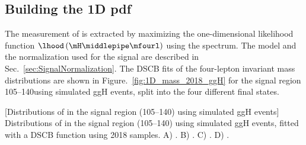 \subsection{Building the 1D pdf}
The measurement of \mH is extracted by maximizing the one-dimensional likelihood function $\lhood \left( \mH \middlepipe \mfourl \right)$ using the \mfourl spectrum.  %
The model and the normalization used for the signal are described in Sec.~\ref{sec:SignalNormalization}.
The DSCB fits of the four-lepton invariant mass distributions are shown in Figure.~\ref{fig:1D_mass_2018_ggH} for the signal region 105--140\GeV using simulated ggH events, split into the four different final states.
\begin{multiFigure}
    \centering
        [Distributions of \mfourl in the signal region (105--140\GeV) using simulated ggH events]
        {Distributions of \mfourl in the signal region (105--140\GeV) using simulated ggH events, fitted with a DSCB function using 2018 samples.
        \;A) \fourmu.
        \;B) \foure.
        \;C) \twoetwomu.
        \;D) \twomutwoe.
    }
    \label{fig:1D_mass_2018_ggH}
\end{multiFigure}

